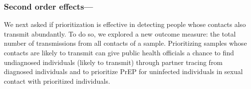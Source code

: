 \documentclass[a4paper,10pt]{article}
\newcommand{\PLWH}{sample\xspace}
\begin{document}
\subsubsection{Second order effects---}
We next asked if prioritization is effective in detecting people whose contacts also transmit abundantly. 
To do so, we explored a new outcome measure: the total number of transmissions from all contacts of a \PLWH. 
Prioritizing \PLWH{s} whose contacts are likely to transmit can give public health officials a chance to find undiagnosed individuals (likely to transmit) through partner tracing from diagnosed individuals and to  prioritize PrEP for uninfected individuals in sexual contact with prioritized individuals. 




\end{document}
